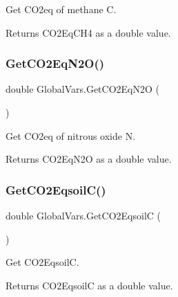 Get C\+O2eq of methane C. 

\begin{DoxyReturn}{Returns}
C\+O2\+Eq\+C\+H4 as a double value. 
\end{DoxyReturn}
\mbox{\label{class_global_vars_a21329208db96df468bea834b2467fe00}} 
\subsubsection{\texorpdfstring{GetCO2EqN2O()}{GetCO2EqN2O()}}
{\footnotesize\ttfamily double Global\+Vars.\+Get\+C\+O2\+Eq\+N2O (\begin{DoxyParamCaption}{ }\end{DoxyParamCaption})\hspace{0.3cm}{\ttfamily [inline]}}



Get C\+O2eq of nitrous oxide N. 

\begin{DoxyReturn}{Returns}
C\+O2\+Eq\+N2O as a double value. 
\end{DoxyReturn}
\mbox{\label{class_global_vars_a1a2f3998d5e4cb4bf6f633b30b5433c0}} 
\subsubsection{\texorpdfstring{GetCO2EqsoilC()}{GetCO2EqsoilC()}}
{\footnotesize\ttfamily double Global\+Vars.\+Get\+C\+O2\+EqsoilC (\begin{DoxyParamCaption}{ }\end{DoxyParamCaption})\hspace{0.3cm}{\ttfamily [inline]}}



Get C\+O2\+EqsoilC. 

\begin{DoxyReturn}{Returns}
C\+O2\+EqsoilC as a double value. 
\end{DoxyReturn}
\mbox{\label{class_global_vars_a5dd795fb00a43c71cc25f921fde2dc06}} 
